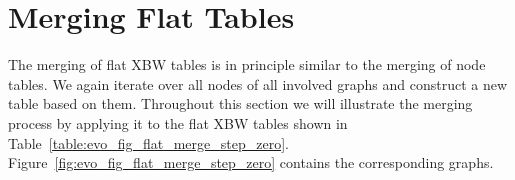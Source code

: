 \documentclass[a4paper,12pt,twoside,BCOR=10mm]{scrbook}
\begin{document}
\section{Merging Flat Tables}
\label{sec:merging_flat_tables}
%

The merging of flat XBW tables is in principle similar to the merging of node tables.
We again iterate over all nodes of all involved graphs and construct a new table
based on them. Throughout this section we will illustrate the merging process
by applying it to the flat XBW tables shown in
Table~\ref{table:evo_fig_flat_merge_step_zero}.
Figure~\ref{fig:evo_fig_flat_merge_step_zero} contains the corresponding graphs.
\end{document}
